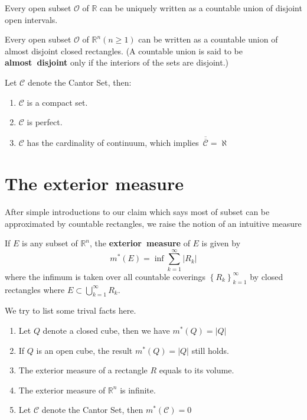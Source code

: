 \documentclass{ctexbook}
\begin{document}
\begin{thm}
    Every open subset $\mathcal{O}$ of $\mathbb{R}$ can be uniquely written as a countable union of disjoint open intervals.
\end{thm}
\begin{thm}
    Every open subset $\mathcal{O}$ of $\mathbb{R}^n (n\geq 1)$ can be written as a countable union of almost disjoint closed
    rectangles. (A countable union is said to be \textbf{almost~disjoint} only if the interiors of the sets are disjoint.)
\end{thm}
\begin{fact}
    Let $\mathcal{C} $ denote the Cantor Set, then:
    \begin{enumerate}
        \item $\mathcal{C} $ is a compact set.
        \item $\mathcal{C} $ is perfect.
        \item $\mathcal{C} $ has the cardinality of continuum, which implies $\,\overline{\overline{\mathcal{C}}} = \aleph$
    \end{enumerate}
\end{fact}

\section{The exterior measure}

After simple introductions to our claim which says most of subset can be approximated by countable rectangles, we raise the
notion of an intuitive measure 

\begin{define}
    If $E$ is any subset of $\mathbb{R}^n$, the \textbf{exterior~measure} of $E$ is given by
    \[m^*(E)=\inf\sum\limits_{k=1}^{\infty}\left|R_k\right|\]
    where the infimum is taken over all countable coverings $\left\{R_k\right\}_{k=1}^{\infty}$ by closed rectangles where 
    $E \subset \bigcup\limits_{k=1}^{\infty}R_k$.
\end{define}

\begin{fact}
    We try to list some trival facts here.
    \begin{enumerate}
        \item Let $Q$ denote a closed cube, then we have $m^*(Q) = \left\lvert Q\right\rvert $
        \item If $Q$ is an open cube, the result $m^*(Q) = \left\lvert Q\right\rvert $ still holds.
        \item The exterior measure of a rectangle $R$ equals to its volume.
        \item The exterior measure of $\mathbb{R}^n$ is infinite.
        \item Let $\mathcal{C} $ denote the Cantor Set, then $m^*(\mathcal{C})=0$
    \end{enumerate}
\end{fact}
\end{document}
